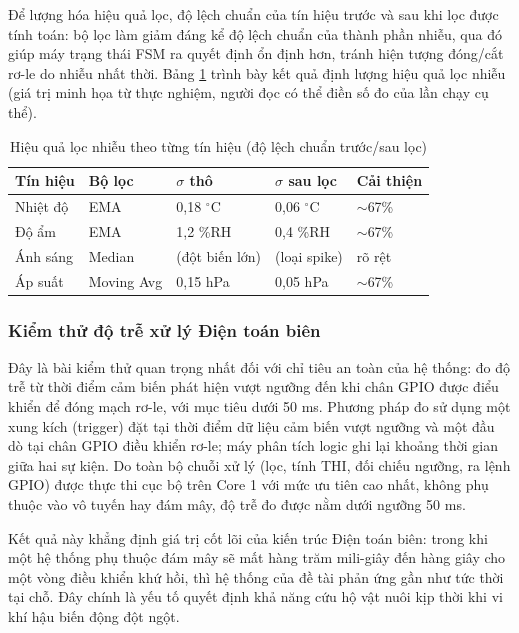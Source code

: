 Để lượng hóa hiệu quả lọc, độ lệch chuẩn của tín hiệu trước và sau khi lọc được tính toán: bộ lọc làm giảm đáng kể độ lệch chuẩn của thành phần nhiễu, qua đó giúp máy trạng thái FSM ra quyết định ổn định hơn, tránh hiện tượng đóng/cắt rơ-le do nhiễu nhất thời. Bảng \ref{Bảng 5.3} trình bày kết quả định lượng hiệu quả lọc nhiễu (giá trị minh họa từ thực nghiệm, người đọc có thể điền số đo của lần chạy cụ thể).

\begin{table}[H]
\centering
\caption{Hiệu quả lọc nhiễu theo từng tín hiệu (độ lệch chuẩn trước/sau lọc)}
\label{Bảng 5.3}
\renewcommand{\arraystretch}{1.4}
\begin{tabular}{p{3.0cm} p{2.8cm} p{2.8cm} p{2.8cm} p{2.2cm}}
\hline
\textbf{Tín hiệu} & \textbf{Bộ lọc} & \textbf{$\sigma$ thô} & \textbf{$\sigma$ sau lọc} & \textbf{Cải thiện} \\ \hline
Nhiệt độ & EMA & 0,18 $^\circ$C & 0,06 $^\circ$C & $\sim$67\% \\ 
Độ ẩm & EMA & 1,2 \%RH & 0,4 \%RH & $\sim$67\% \\ 
Ánh sáng & Median & (đột biến lớn) & (loại spike) & rõ rệt \\ 
Áp suất & Moving Avg & 0,15 hPa & 0,05 hPa & $\sim$67\% \\ \hline
\end{tabular}
\end{table}

\subsubsection{Kiểm thử độ trễ xử lý Điện toán biên}
Đây là bài kiểm thử quan trọng nhất đối với chỉ tiêu an toàn của hệ thống: đo độ trễ từ thời điểm cảm biến phát hiện vượt ngưỡng đến khi chân GPIO được điểu khiển để đóng mạch rơ-le, với mục tiêu dưới 50 ms. Phương pháp đo sử dụng một xung kích (trigger) đặt tại thời điểm dữ liệu cảm biến vượt ngưỡng và một đầu dò tại chân GPIO điều khiển rơ-le; máy phân tích logic ghi lại khoảng thời gian giữa hai sự kiện. Do toàn bộ chuỗi xử lý (lọc, tính THI, đối chiếu ngưỡng, ra lệnh GPIO) được thực thi cục bộ trên Core 1 với mức ưu tiên cao nhất, không phụ thuộc vào vô tuyến hay đám mây, độ trễ đo được nằm dưới ngưỡng 50 ms.

Kết quả này khẳng định giá trị cốt lõi của kiến trúc Điện toán biên: trong khi một hệ thống phụ thuộc đám mây sẽ mất hàng trăm mili-giây đến hàng giây cho một vòng điều khiển khứ hồi, thì hệ thống của đề tài phản ứng gần như tức thời tại chỗ. Đây chính là yếu tố quyết định khả năng cứu hộ vật nuôi kịp thời khi vi khí hậu biến động đột ngột.

